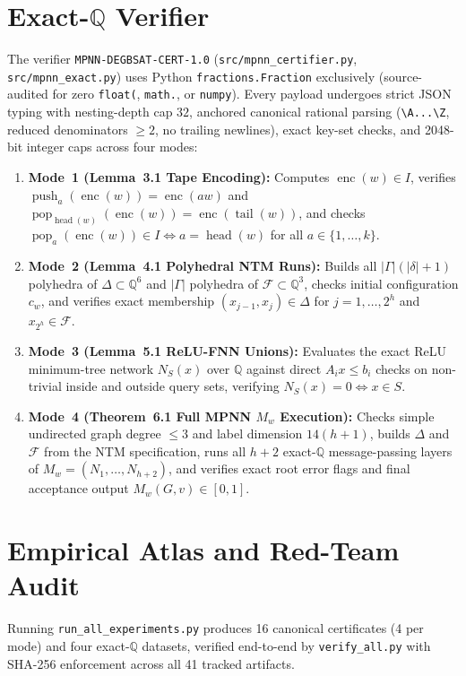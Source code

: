 \documentclass[10pt,twocolumn]{article}
\newcommand{\QQ}{\mathbb{Q}}
\newcommand{\enc}{\operatorname{enc}}
\newcommand{\push}{\operatorname{push}}
\newcommand{\pop}{\operatorname{pop}}
\begin{document}
\section{Exact-\texorpdfstring{$\QQ$}{Q} Verifier}\label{sec:cert}
The verifier \texttt{MPNN-DEGBSAT-CERT-1.0} (\texttt{src/mpnn\_certifier.py}, \texttt{src/mpnn\_exact.py}) uses Python \texttt{fractions.Fraction} exclusively (source-audited for zero \texttt{float(}, \texttt{math.}, or \texttt{numpy}). Every payload undergoes strict JSON typing with nesting-depth cap $32$, anchored canonical rational parsing (\texttt{\textbackslash A...\textbackslash Z}, reduced denominators $\ge 2$, no trailing newlines), exact key-set checks, and 2048-bit integer caps across four modes:
\begin{enumerate}[leftmargin=*,nosep]
  \item \textbf{Mode~1 (Lemma~3.1 Tape Encoding):} Computes $\enc(w) \in I$, verifies $\push_a(\enc(w)) = \enc(aw)$ and $\pop_{\operatorname{head}(w)}(\enc(w)) = \enc(\operatorname{tail}(w))$, and checks $\pop_a(\enc(w)) \in I \iff a = \operatorname{head}(w)$ for all $a \in \{1,\dots,k\}$.
  \item \textbf{Mode~2 (Lemma~4.1 Polyhedral NTM Runs):} Builds all $|\Gamma|(|\delta|+1)$ polyhedra of $\Delta \subset \QQ^6$ and $|\Gamma|$ polyhedra of $\mathcal{F} \subset \QQ^3$, checks initial configuration $c_w$, and verifies exact membership $(x_{j-1}, x_j) \in \Delta$ for $j = 1,\dots,2^h$ and $x_{2^h} \in \mathcal{F}$.
  \item \textbf{Mode~3 (Lemma~5.1 ReLU-FNN Unions):} Evaluates the exact ReLU minimum-tree network $N_S(x)$ over $\QQ$ against direct $A_i x \le b_i$ checks on non-trivial inside and outside query sets, verifying $N_S(x) = 0 \iff x \in S$.
  \item \textbf{Mode~4 (Theorem~6.1 Full MPNN $M_w$ Execution):} Checks simple undirected graph degree $\le 3$ and label dimension $14(h+1)$, builds $\Delta$ and $\mathcal{F}$ from the NTM specification, runs all $h + 2$ exact-$\QQ$ message-passing layers of $M_w = (N_1, \dots, N_{h+2})$, and verifies exact root error flags and final acceptance output $M_w(G, v) \in [0, 1]$.
\end{enumerate}

\section{Empirical Atlas and Red-Team Audit}\label{sec:results}
Running \texttt{run\_all\_experiments.py} produces 16 canonical certificates (4 per mode) and four exact-$\QQ$ datasets, verified end-to-end by \texttt{verify\_all.py} with SHA-256 enforcement across all 41 tracked artifacts.
\end{document}
